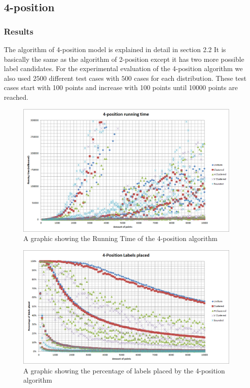 \documentclass[crop=false,a4paper,oneside,11pt]{standalone}
\begin{document}
\subsection{4-position}
\subsubsection{Results}
The algorithm of 4-position model is explained in detail in section 2.2 It is basically the same as the algorithm of 2-position except it has two more possible label candidates. For the experimental evaluation of the 4-position algorithm we also used $2500$ different test cases with $500$ cases for each distribution. These test cases start with 100 points and increase with 100 points until 10000 points are reached.\\ 

 \begin{figure}[h!]
 \centering
 \centerline{\includegraphics[scale = 0.5]{4PosRunningTime.png}}
 \caption{A graphic showing the Running Time of the 4-position algorithm}
 \end{figure}

 \begin{figure}[h!]
 \centering
  \centerline{\includegraphics[scale = 0.5]{4PosLabelsPlaced.png}}
  \caption{A graphic showing the percentage of labels placed by the 4-position algorithm}
 \end{figure}
 
\end{document}
